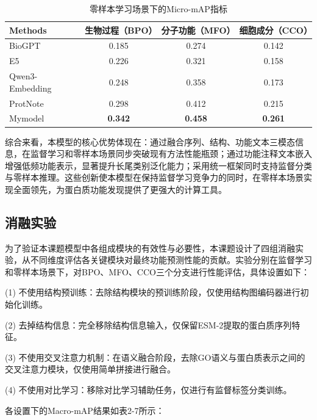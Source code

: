 \begin{table}[h]
\centering
\caption{零样本学习场景下的Micro-mAP指标}
\begin{tabular}{lccc}
\hline
Methods & 生物过程（BPO） & 分子功能（MFO） & 细胞成分（CCO） \\
\hline
BioGPT & 0.185 & 0.274 & 0.142 \\
E5 & 0.226 & 0.321 & 0.158 \\
Qwen3-Embedding & 0.248 & 0.358 & 0.173 \\
ProtNote & 0.298 & 0.412 & 0.215 \\
Mymodel & \textbf{0.342} & \textbf{0.458} & \textbf{0.261} \\
\hline
\end{tabular}
\end{table}

综合来看，本模型的核心优势体现在：通过融合序列、结构、功能文本三模态信息，在监督学习和零样本场景同步突破现有方法性能瓶颈；通过功能注释文本嵌入增强低频功能表示，显著提升长尾类别泛化能力；采用统一框架同时支持监督分类与零样本推理。这些创新使本模型在保持监督学习竞争力的同时，在零样本场景实现全面领先，为蛋白质功能发现提供了更强大的计算工具。

\subsection{消融实验}
为了验证本课题模型中各组成模块的有效性与必要性，本课题设计了四组消融实验，从不同维度评估各关键模块对最终功能预测性能的贡献。实验分别在监督学习和零样本场景下，对BPO、MFO、CCO三个分支进行性能评估，具体设置如下：

(1) 不使用结构预训练：去除结构模块的预训练阶段，仅使用结构图编码器进行初始化训练。

(2) 去掉结构信息：完全移除结构信息输入，仅保留ESM-2提取的蛋白质序列特征。

(3) 不使用交叉注意力机制：在语义融合阶段，去除GO语义与蛋白质表示之间的交叉注意力模块，仅使用简单拼接进行融合。

(4) 不使用对比学习：移除对比学习辅助任务，仅进行有监督标签分类训练。

各设置下的Macro-mAP结果如表2-7所示：

